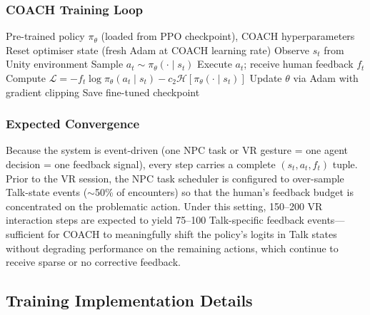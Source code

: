 \documentclass[../report.tex]{subfiles}
\begin{document}
    \subsubsection{COACH Training Loop}

    \begin{algorithm}[H]
        \caption{COACH Fine-Tuning Loop}
        \label{alg:coach}
        \begin{algorithmic}[1]
            \Require Pre-trained policy $\pi_\theta$ (loaded from PPO checkpoint), COACH hyperparameters
            \State Reset optimiser state (fresh Adam at COACH learning rate)
                \State Observe $s_t$ from Unity environment
                \State Sample $a_t \sim \pi_\theta(\cdot \mid s_t)$
                \State Execute $a_t$; receive human feedback $f_t$
                 
                    \State Compute $\mathcal{L} = -f_t \log \pi_\theta(a_t \mid s_t) - c_2 \mathcal{H}[\pi_\theta(\cdot \mid s_t)]$
                    \State Update $\theta$ via Adam with gradient clipping
                \EndIf
            \EndFor
            \State Save fine-tuned checkpoint
        \end{algorithmic}
    \end{algorithm}

    \subsubsection{Expected Convergence}

    Because the system is event-driven (one NPC task or VR gesture = one agent decision = one feedback signal), every step carries a complete $(s_t, a_t, f_t)$ tuple. Prior to the VR session, the NPC task scheduler is configured to over-sample Talk-state events ($\sim$50\% of encounters) so that the human's feedback budget is concentrated on the problematic action. Under this setting, 150--200 VR interaction steps are expected to yield 75--100 Talk-specific feedback events—sufficient for COACH to meaningfully shift the policy's logits in Talk states without degrading performance on the remaining actions, which continue to receive sparse or no corrective feedback.

    \subsection{Training Implementation Details}
\end{document}

